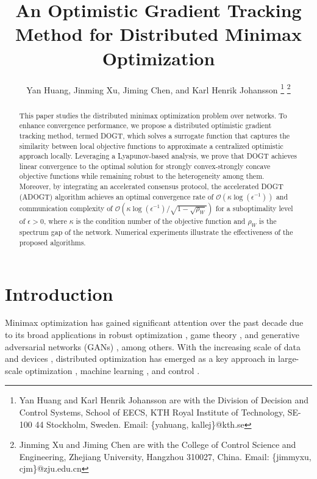 \documentclass[letterpaper, 10 pt, conference]{ieeeconf}
\title{\LARGE \bf  
An Optimistic Gradient Tracking Method for Distributed Minimax Optimization
}
\author{Yan Huang, Jinming Xu, Jiming Chen, and Karl Henrik Johansson %
\thanks{Yan Huang and Karl Henrik Johansson are with the Division of Decision and Control Systems, School of EECS, KTH Royal Institute of Technology, SE-100 44 Stockholm, Sweden. Email: \{yahuang, kallej\}@kth.se}
\thanks{Jinming Xu and Jiming Chen are with the College of Control Science and Engineering, Zhejiang University, Hangzhou 310027, China. Email: \{jimmyxu, cjm\}@zju.edu.cn
}}
\begin{document}
\maketitle

\begin{abstract}
This paper studies the distributed minimax optimization problem over networks. To enhance convergence performance, we propose a distributed optimistic gradient tracking method, termed DOGT, which solves a surrogate function that captures the similarity between local objective functions to approximate a centralized optimistic approach locally. Leveraging a Lyapunov-based analysis, we prove that DOGT achieves linear convergence to the optimal solution for strongly convex-strongly concave objective functions while remaining robust to the heterogeneity among them. Moreover, by integrating an accelerated consensus protocol, the accelerated DOGT (ADOGT) algorithm achieves an optimal convergence rate of  $\mathcal{O} \left( \kappa \log \left( \epsilon ^{-1} \right) \right) $ and communication complexity of $\mathcal{O} \left( \kappa \log \left( \epsilon ^{-1} \right) /\sqrt{1-\sqrt{\rho _W}} \right)$ for a suboptimality level of $\epsilon>0$, where $\kappa$ is the condition number of the objective function and $\rho_W$ is the spectrum gap of the network. Numerical experiments illustrate the effectiveness of the proposed algorithms.
\end{abstract}


\section{Introduction}


Minimax optimization has gained significant attention over the past decade due to its broad applications in robust optimization \cite{mohri2019agnostic, sinha2017certifying}, game theory \cite{vamvoudakis2023game}, and generative adversarial networks (GANs) \cite{goodfellow2014generative, gulrajani2017improved}, among others.
With the increasing scale of data and devices \cite{konevcny2016federated}, distributed optimization has emerged as a key approach in large-scale optimization \cite{nedic2018distributed}, machine learning \cite{lian2017can}, and control \cite{molzahn2017survey}.
\end{document}

